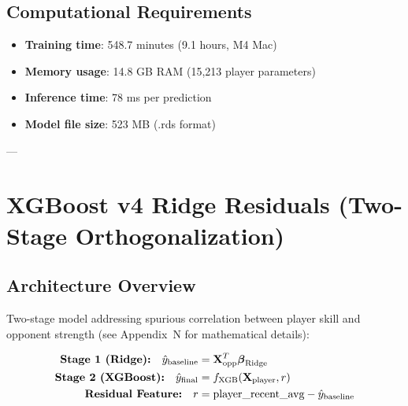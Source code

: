 \subsection{Computational Requirements}

\begin{itemize}
\item \textbf{Training time}: 548.7 minutes (9.1 hours, M4 Mac)
\item \textbf{Memory usage}: 14.8 GB RAM (15,213 player parameters)
\item \textbf{Inference time}: 78 ms per prediction
\item \textbf{Model file size}: 523 MB (.rds format)
\end{itemize}

---

\section{XGBoost v4 Ridge Residuals (Two-Stage Orthogonalization)}
\label{sec:xgboost-v4-ridge-appendix}

\begin{center}
\end{center}

\subsection{Architecture Overview}

Two-stage model addressing spurious correlation between player skill and opponent strength (see Appendix~N for mathematical details):

\begin{align}
\text{\textbf{Stage 1 (Ridge):}} \quad \hat{y}_{\text{baseline}} &= \mathbf{X}_{\text{opp}}^T \boldsymbol{\beta}_{\text{Ridge}} \\
\text{\textbf{Stage 2 (XGBoost):}} \quad \hat{y}_{\text{final}} &= f_{\text{XGB}}(\mathbf{X}_{\text{player}}, r) \\
\text{\textbf{Residual Feature:}} \quad r &= \text{player\_recent\_avg} - \hat{y}_{\text{baseline}}
\label{eq:ridge-residuals-architecture}
\end{align}

